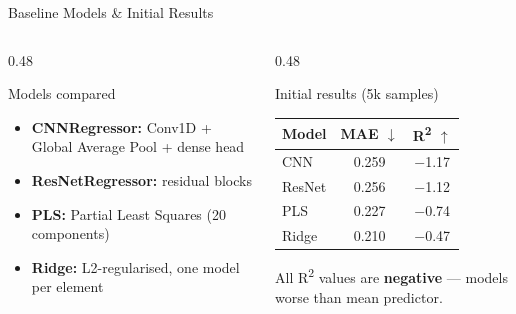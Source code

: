 \begin{frame}{Baseline Models \& Initial Results}
    \begin{columns}[t]
        \begin{column}{0.48\textwidth}
            \begin{block}{Models compared}
                \begin{itemize}
                    \item \textbf{CNNRegressor:} Conv1D + Global Average Pool + dense head
                    \item \textbf{ResNetRegressor:} residual blocks
                    \item \textbf{PLS:} Partial Least Squares (20 components)
                    \item \textbf{Ridge:} L2-regularised, one model per element
                \end{itemize}
            \end{block}
        \end{column}
        \begin{column}{0.48\textwidth}
            \begin{block}{Initial results (5k samples)}
                \small
                \begin{tabular}{lcc}
                    \toprule
                    Model & MAE $\downarrow$ & R\textsuperscript{2} $\uparrow$ \\
                    \midrule
                    CNN    & 0.259 & $-$1.17 \\
                    ResNet & 0.256 & $-$1.12 \\
                    PLS    & 0.227 & $-$0.74 \\
                    Ridge  & 0.210 & $-$0.47 \\
                    \bottomrule
                \end{tabular}
            \end{block}
            \vspace{0.2cm}
            \small All R\textsuperscript{2} values are \textbf{negative} — models worse than mean predictor.
        \end{column}
    \end{columns}
\end{frame}

